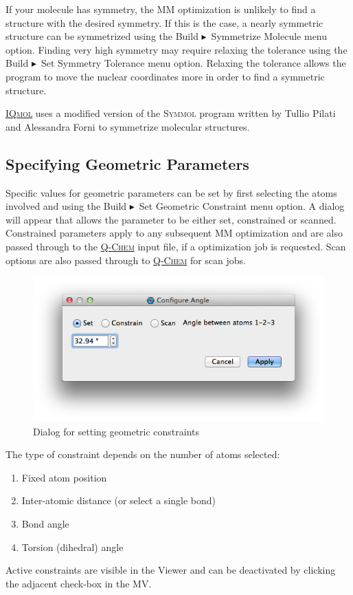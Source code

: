\documentclass[a4paper,12pt]{article}
\newcommand{\qchem}{\href{https://q-chem.com}{{\scshape Q-Chem}}}
\newcommand{\iqmol}{\href{https://www.iqmol.org}{{\scshape IQmol}}}
\newcommand{\symmol}{{\scshape Symmol}}
\newcommand{\bt}{\ensuremath{\blacktriangleright}}
\begin{document}
If your molecule has symmetry, the MM optimization is unlikely to find a
structure with the desired symmetry.  If this is the case, a nearly symmetric
structure can be symmetrized using the Build \bt\ Symmetrize
Molecule menu option.  Finding very high symmetry may require relaxing the
tolerance using the Build \bt\ Set Symmetry Tolerance menu
option.  Relaxing the tolerance allows the program to move the nuclear
coordinates more in order to find a symmetric structure.

\iqmol{} uses a modified version of the \symmol{}\cite{SymMol} program written
by Tullio Pilati and Alessandra Forni to symmetrize molecular structures.



\subsection{Specifying Geometric Parameters}

Specific values for geometric parameters can be set by first selecting the
atoms involved and using the Build \bt\ Set Geometric Constraint menu
option.  A dialog will appear that allows the parameter to be either set,
constrained or scanned.  Constrained parameters apply to any subsequent MM
optimization and are also passed through to the \qchem{} input file, if a
optimization job is requested.  Scan options are also passed through to
\qchem{} for scan jobs.

\begin{figure}[h]
\begin{center}
\includegraphics[scale=0.5]{figures/ConstraintDialog.png}
\caption{Dialog for setting geometric constraints}
\end{center}
\end{figure}

The type of constraint depends on the number of atoms selected:
\vspace{-1em}
\begin{enumerate}
\itemsep0em
\item Fixed atom position
\item Inter-atomic distance (or select a single bond)
\item Bond angle
\item Torsion (dihedral) angle
\end{enumerate}
Active constraints are visible in the Viewer and can be deactivated by clicking
the adjacent check-box in the MV.
\end{document}
